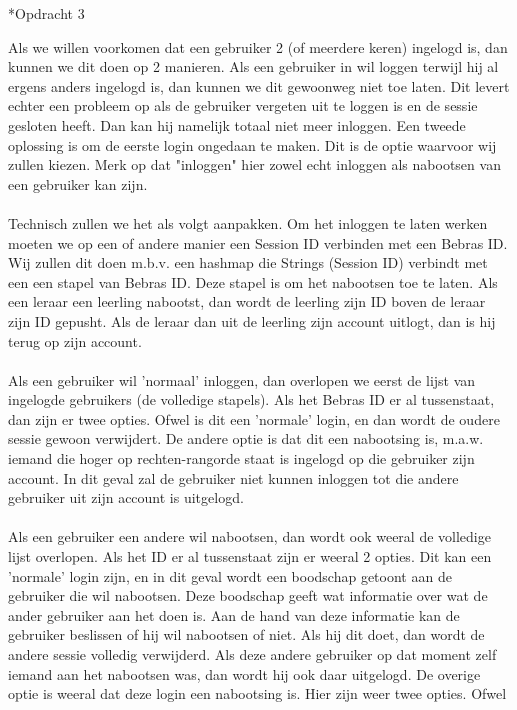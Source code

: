 
\begin{section}*{Opdracht 3}

Als we willen voorkomen dat een gebruiker 2 (of meerdere keren) ingelogd is, dan kunnen we dit doen op 2 manieren. Als een gebruiker in wil loggen terwijl hij al ergens anders ingelogd is, dan kunnen we dit gewoonweg niet toe laten. Dit levert echter een probleem op als de gebruiker vergeten uit te loggen is en de sessie gesloten heeft. Dan kan hij namelijk totaal niet meer inloggen. Een tweede oplossing is om de eerste login ongedaan te maken. Dit is de optie waarvoor wij zullen kiezen. Merk op dat "inloggen" hier zowel echt inloggen als nabootsen van een gebruiker kan zijn.
\\\\
Technisch zullen we het als volgt aanpakken. Om het inloggen te laten werken moeten we op een of andere manier een Session ID verbinden met een Bebras ID. Wij zullen dit doen m.b.v. een hashmap die Strings (Session ID) verbindt met een een stapel van Bebras ID. Deze stapel is om het nabootsen toe te laten. Als een leraar een leerling nabootst, dan wordt de leerling zijn ID boven de leraar zijn ID gepusht. Als de leraar dan uit de leerling zijn account uitlogt, dan is hij terug op zijn account.
\\\\
Als een gebruiker wil 'normaal' inloggen, dan overlopen we eerst de lijst van ingelogde gebruikers (de volledige stapels). Als het Bebras ID er al tussenstaat, dan zijn er twee opties. Ofwel is dit een 'normale' login, en dan wordt de oudere sessie gewoon verwijdert. De andere optie is dat dit een nabootsing is, m.a.w. iemand die hoger op rechten-rangorde staat is ingelogd op die gebruiker zijn account. In dit geval zal de gebruiker niet kunnen inloggen tot die andere gebruiker uit zijn account is uitgelogd.
\\\\
Als een gebruiker een andere wil nabootsen, dan wordt ook weeral de volledige lijst overlopen. Als het ID er al tussenstaat zijn er weeral 2 opties. Dit kan een 'normale' login zijn, en in dit geval wordt een boodschap getoont aan de gebruiker die wil nabootsen. Deze boodschap geeft wat informatie over wat de ander gebruiker aan het doen is. Aan de hand van deze informatie kan de gebruiker beslissen of hij wil nabootsen of niet. Als hij dit doet, dan wordt de andere sessie volledig verwijderd. Als deze andere gebruiker op dat moment zelf iemand aan het nabootsen was, dan wordt hij ook daar uitgelogd. De overige optie is weeral dat deze login een nabootsing is. Hier zijn weer twee opties. Ofwel is het iemand met dezelfde rechten (bvb. een Organizer wil een Teacher nabootsen die al nagebootst is door een andere Organizer). In dit geval gebeurt hetzelfde als ware het een normale login. Indien de Organizer doorgaat met nabootsen wordt de andere gebruiker enkel maar uit de nagebootste login verwijderd, en niet uit zijn normale login. Het laatste geval is dat de andere nabootsing gebeurt door iemand met hogere rechten. In dit geval zal de gebruiker de andere gebruiker niet kunnen nabootsen.

\end{section}
